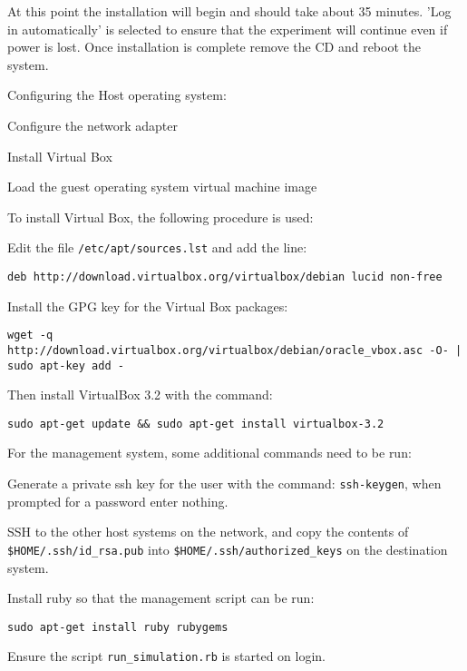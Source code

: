 At this point the installation will begin and should take about 35 minutes. 'Log in automatically' is selected to ensure that the experiment will continue even if power is lost. Once installation is complete remove the CD and reboot the system.

Configuring the Host operating system:

\begin{enumerate*}
  \item Configure the network adapter
  \item Install Virtual Box
  \item Load the guest operating system virtual machine image
\end{enumerate*}

To install Virtual Box, the following procedure is used:

\begin{enumerate*}
  \item Edit the file \verb+/etc/apt/sources.lst+ and add the line:
  \begin{verbatim}
deb http://download.virtualbox.org/virtualbox/debian lucid non-free
  \end{verbatim}
  \item Install the GPG key for the Virtual Box packages:
  \begin{verbatim}
wget -q http://download.virtualbox.org/virtualbox/debian/oracle_vbox.asc -O- | sudo apt-key add -
  \end{verbatim}
  \item Then install VirtualBox 3.2 with the command:
  \begin{verbatim}
sudo apt-get update && sudo apt-get install virtualbox-3.2
  \end{verbatim}
\end{enumerate*}

For the management system, some additional commands need to be run:

\begin{enumerate*}
  \item Generate a private ssh key for the user with the command: \verb+ssh-keygen+, when prompted for a password enter nothing.
  \item SSH to the other host systems on the network, and copy the contents of \verb+$HOME/.ssh/id_rsa.pub+ into \verb+$HOME/.ssh/authorized_keys+ on the destination system.
  \item Install ruby so that the management script can be run:
    \begin{verbatim}
sudo apt-get install ruby rubygems
    \end{verbatim}
  \item Ensure the script \verb+run_simulation.rb+ is started on login.
\end{enumerate*}

